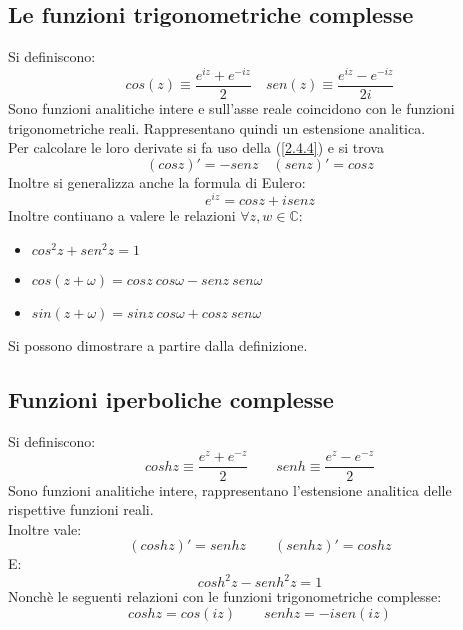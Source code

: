 \documentclass[twoside]{article}
\begin{document}
		\subsection{Le funzioni trigonometriche complesse}
	Si definiscono:
	\begin{equation}
		cos(z)\equiv\frac{e^{iz}+e^{-iz}}{2} \quad sen(z)\equiv\frac{e^{iz}-e^{-iz}}{2i}
	\end{equation}
	Sono funzioni analitiche intere e sull'asse reale coincidono con le funzioni trigonometriche reali. Rappresentano quindi un estensione analitica.\\
	Per calcolare le loro derivate si fa uso della (\ref{2.4.4})  e si trova
	\begin{equation}
		(cosz)'=-senz \quad (senz)'=cosz
	\end{equation}
	Inoltre si generalizza anche la formula di Eulero:
	\begin{equation}
		e^{iz}=cosz+isenz
	\end{equation}
	Inoltre contiuano a valere le relazioni $\forall z,w \in \mathds{C}$:
	\begin{itemize}
		\item $cos^2z+sen^2z=1 $
		\item $cos(z+\omega)=cosz \ cos\omega-senz \ sen\omega$
		\item $sin(z+\omega)=sinz \ cos\omega+cosz \ sen\omega$
	\end{itemize}
	Si possono dimostrare a partire dalla definizione.
    \subsection{Funzioni iperboliche complesse}
    Si definiscono:
    \begin{equation}
        coshz\equiv\frac{e^z+e^{-z}}{2} \qquad senh\equiv\frac{e^z-e^{-z}}{2}
    \end{equation}
    Sono funzioni analitiche intere, rappresentano l'estensione analitica delle rispettive funzioni reali.\\
    Inoltre vale:
    \begin{equation}
        (coshz)'=senhz  \qquad (senhz)'=coshz
    \end{equation}
    E:
    \begin{equation}
        cosh^2z-senh^2z=1
    \end{equation}
    Nonchè le seguenti relazioni con le funzioni trigonometriche complesse:
    \begin{equation}
        coshz=cos(iz) \qquad senhz=-isen(iz)
    \end{equation}
\end{document}
